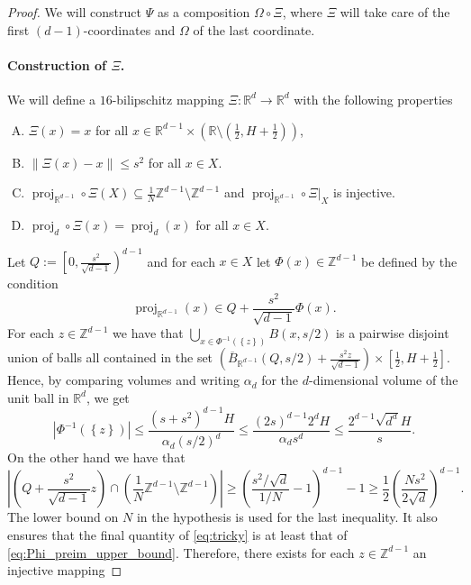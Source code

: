 \documentclass[a4paper, bibliography=totoc]{scrartcl}
\numberwithin{claimcounter}{define}
\newcommand{\R}{\mathbb{R}}
\newcommand{\Z}{\mathbb{Z}}
\DeclareMathOperator{\proj}{proj}
\newcommand{\abs}[1]{\left|#1\right|}
\newcommand{\enorm}[1]{\left\|#1\right\|}
\newcommand{\set}[1]{\left\{#1\right\}}
\newcommand{\br}[1]{\left(#1\right)}
\newcommand{\sqbr}[1]{\left[#1\right]}
\newcommand{\cl}[1]{\overline{#1}}
\begin{document}
\begin{proof}
	We will construct $\Psi$ as a composition $\Omega\circ \Xi$, where $\Xi$ will take care of the first $(d-1)$-coordinates and $\Omega$ of the last coordinate. 
	\paragraph{Construction of $\Xi$.}
	We will define a $16$-bilipschitz mapping $\Xi\colon\R^{d}\to\R^{d}$ with the following properties
	\begin{enumerate}[(A)]
		\item\label{Psi_i} $\Xi(x)=x$ for all $x\in\R^{d-1}\times \br{\R\setminus \br{\frac{1}{2},H+\frac{1}{2}}}$,
		\item\label{Psi_ii} $\enorm{\Xi(x)-x}\leq s^{2}$ for all $x\in X$. 
		\item\label{Psi_iii} $\proj_{\R^{d-1}}\circ \Xi(X)\subseteq \frac{1}{N}\Z^{d-1}\setminus \Z^{d-1}$ and $\proj_{\R^{d-1}}\circ \Xi|_{X}$ is injective.
		\item\label{Psi_iv} $\proj_{d}\circ \Xi(x)=\proj_{d}(x)$ for all $x\in X$.
	\end{enumerate}
	Let $Q:=\left[0,\frac{s^{2}}{\sqrt{d-1}}\right)^{d-1}$ and for each $x\in X$ let $\Phi(x)\in\Z^{d-1}$ be defined by the condition
	\begin{equation*}
	\proj_{\R^{d-1}}(x)\in Q+\frac{s^{2}}{\sqrt{d-1}}\Phi(x).
	\end{equation*}
	For each $z\in\Z^{d-1}$ we have that $\bigcup_{x\in\Phi^{-1}(\set{z})}B(x,s/2)$ is a pairwise disjoint union of balls all contained in the set $\br{\cl{B}_{\R^{d-1}}(Q,s/2)+\frac{s^{2}z}{\sqrt{d-1}}}\times\sqbr{\frac{1}{2},H+\frac{1}{2}}$. Hence, by comparing volumes and writing $\alpha_{d}$ for the $d$-dimensional volume of the unit ball in $\R^{d}$, we get
	\begin{equation}\label{eq:Phi_preim_upper_bound}
	\abs{\Phi^{-1}(\set{z})}\leq \frac{(s+s^{2})^{d-1}H}{\alpha_{d}\br{s/2}^{d}}\leq\frac{(2s)^{d-1}2^{d}H}{\alpha_{d}s^{d}}\leq \frac{2^{d-1}\sqrt{d^{d}}H}{s}.
	\end{equation}
	On the other hand we have that 
	\begin{equation}\label{eq:tricky}
	\abs{\br{Q+\frac{s^{2}}{\sqrt{d-1}}z}\cap \br{\frac{1}{N}\Z^{d-1}\setminus\Z^{d-1}}}\geq \br{\frac{s^{2}/\sqrt{d}}{1/N}-1}^{d-1}-1\geq \frac{1}{2}\br{\frac{Ns^{2}}{2\sqrt{d}}}^{d-1} .
	\end{equation}
	The lower bound on $N$ in the hypothesis is used for the last inequality. It also ensures that the final quantity of \eqref{eq:tricky} is at least that of \eqref{eq:Phi_preim_upper_bound}. Therefore, there exists for each $z\in\Z^{d-1}$ an injective mapping  

\end{proof}
\end{document}
